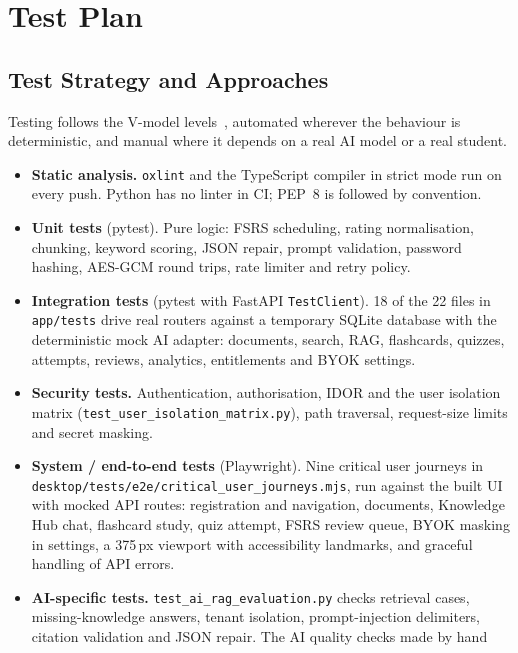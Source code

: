 \section{Test Plan}\label{sec:testplan}

\subsection{Test Strategy and Approaches}\label{sec:test_strategy}

Testing follows the V-model levels~\cite{sommerville2016,iso29119}, automated wherever
the behaviour is deterministic, and manual where it depends on a real AI model or a
real student.

\begin{itemize}[leftmargin=*]
  \item \textbf{Static analysis.} \texttt{oxlint} and the TypeScript compiler in strict
    mode run on every push. Python has no linter in CI; PEP~8 is followed by convention.
  \item \textbf{Unit tests} (pytest). Pure logic: FSRS scheduling, rating
    normalisation, chunking, keyword scoring, JSON repair, prompt validation, password
    hashing, AES-GCM round trips, rate limiter and retry policy.
  \item \textbf{Integration tests} (pytest with FastAPI \texttt{TestClient}). 18 of the 22
    files in \texttt{app/tests} drive real routers against a temporary SQLite database
    with the deterministic mock AI adapter: documents, search, RAG, flashcards, quizzes,
    attempts, reviews, analytics, entitlements and BYOK settings.
  \item \textbf{Security tests.} Authentication, authorisation, IDOR and the user
    isolation matrix (\texttt{test\_user\_isolation\_matrix.py}), path traversal,
    request-size limits and secret masking.
  \item \textbf{System / end-to-end tests} (Playwright). Nine critical user journeys in
    \texttt{desktop/tests/e2e/critical\_user\_journeys.mjs}, run against the built UI with
    mocked API routes: registration and navigation, documents, Knowledge Hub chat,
    flashcard study, quiz attempt, FSRS review queue, BYOK masking in settings, a
    375\,px viewport with accessibility landmarks, and graceful handling of API errors.
  \item \textbf{AI-specific tests.} \texttt{test\_ai\_rag\_evaluation.py} checks
    retrieval cases, missing-knowledge answers, tenant isolation, prompt-injection
    delimiters, citation validation and JSON repair. The AI quality checks made by hand

\end{itemize}

